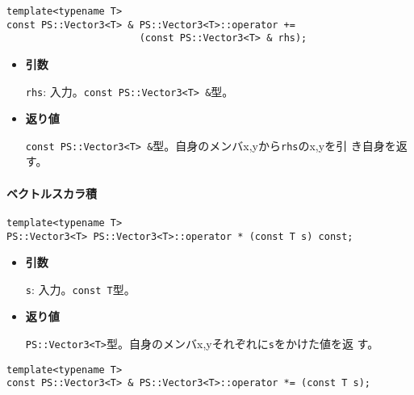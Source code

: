 \begin{screen}
\begin{verbatim}
template<typename T>
const PS::Vector3<T> & PS::Vector3<T>::operator += 
                       (const PS::Vector3<T> & rhs);
\end{verbatim}
\end{screen}

\begin{itemize}

\item{{\bf 引数}}

{\tt rhs}: 入力。{\tt const PS::Vector3<T> \&}型。

\item{{\bf 返り値}}

{\tt const PS::Vector3<T> \&}型。自身のメンバx,yから{\tt rhs}のx,yを引
き自身を返す。

\end{itemize}

\paragraph{ベクトルスカラ積}
\mbox{}

\begin{screen}
\begin{verbatim}
template<typename T>
PS::Vector3<T> PS::Vector3<T>::operator * (const T s) const;
\end{verbatim}
\end{screen}

\begin{itemize}

\item{{\bf 引数}}

{\tt s}: 入力。{\tt const T}型。

\item{{\bf 返り値}}

{\tt PS::Vector3<T>}型。自身のメンバx,yそれぞれに{\tt s}をかけた値を返
す。

\end{itemize}


\begin{screen}
\begin{verbatim}
template<typename T>
const PS::Vector3<T> & PS::Vector3<T>::operator *= (const T s);
\end{verbatim}
\end{screen}

